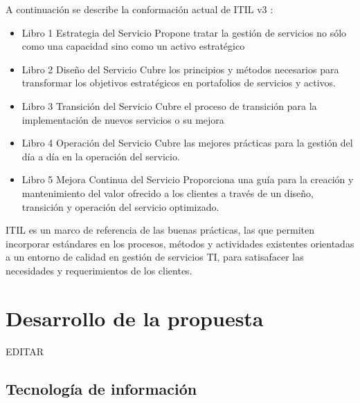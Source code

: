 \documentclass[preprint,12pt]{elsarticle}
\begin{document}
A continuación se describe la conformación actual de ITIL v3 :
\begin{itemize}
\item Libro 1  Estrategia del Servicio 
Propone tratar la gestión de servicios no sólo como una capacidad sino como un activo estratégico
\item Libro 2 Diseño del Servicio
Cubre los principios y métodos necesarios para transformar los objetivos estratégicos en portafolios de servicios y activos.
\item Libro 3 Transición del Servicio
Cubre el proceso de transición para la implementación de nuevos servicios o su mejora
\item Libro 4 Operación del Servicio
Cubre las mejores prácticas para la gestión del día a día en la operación del servicio.
\item Libro 5 Mejora Continua del Servicio
Proporciona una guía para la creación y mantenimiento del valor ofrecido a los clientes a través de un diseño, transición y operación del servicio optimizado.
\end{itemize}
ITIL es un marco de referencia de las buenas prácticas, las que permiten incorporar estándares en los procesos, métodos y actividades existentes orientadas a un entorno de calidad en gestión de servicios TI, para satisafacer las necesidades y requerimientos de los clientes.




\section{Desarrollo de la propuesta}

EDITAR\\


\subsection{\textbf{Tecnología de información}}
\end{document}
